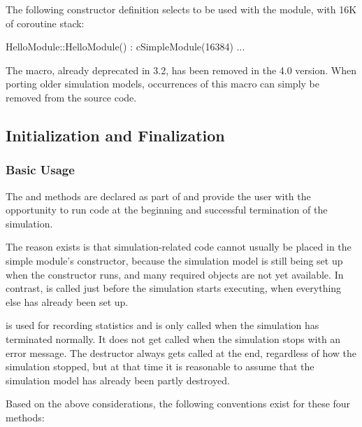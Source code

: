 The following constructor definition selects  to be used
with the module, with 16K of coroutine stack:

\begin{cpp}
HelloModule::HelloModule() : cSimpleModule(16384) {...}
\end{cpp}

\begin{note}
    The  macro, already deprecated in {\opp} 3.2,
    has been removed in the 4.0 version. When porting older simulation models,
    occurrences of this macro can simply be removed from the source code.
\end{note}


\subsection{Initialization and Finalization}
\label{sec:simple-modules:initialize-and-finish}

\subsubsection{Basic Usage}
\label{sec:simple-modules:init-finish:basic-usage}

The  and  methods are declared
as part of  and provide the user with the opportunity
to run code at the beginning and successful termination of the simulation.

The reason  exists is that simulation-related code
cannot usually be placed in the simple module's
constructor, because the simulation model is still
being set up when the constructor runs, and many required objects are not yet
available. In contrast,  is called just before the
simulation starts executing, when everything else has already been set up.

 is used for recording statistics and is only called
when the simulation has terminated normally. It does not get called when
the simulation stops with an error message. The destructor always
gets called at the end, regardless of how the simulation stopped, but
at that time it is reasonable to assume that the simulation model has already been
partly destroyed.

Based on the above considerations, the following conventions exist
for these four methods:


